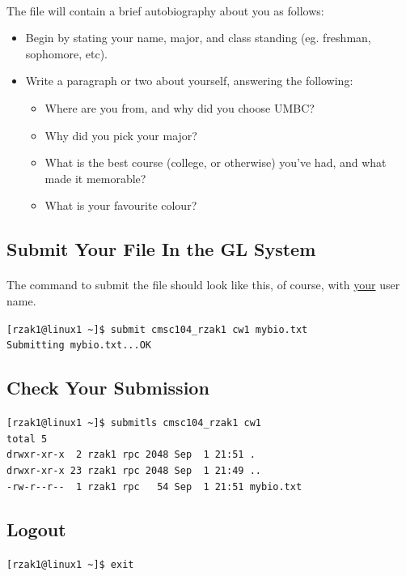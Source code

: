 \documentclass[letter,11pt]{article}
\begin{document}
\paragraph{}The file will contain a brief autobiography about you as follows:
\begin{itemize}
    \item Begin by stating your name, major, and class standing (eg. freshman, sophomore, etc).
    \item Write a paragraph or two about yourself, answering the following:
    \begin{itemize}
        \item Where are you from, and why did you choose UMBC?
        \item Why did you pick your major?
        \item What is the best course (college, or otherwise) you've had, and what made it memorable?
        \item What is your favourite colour?
    \end{itemize}
\end{itemize}

\subsection{Submit Your File In the GL System}
\paragraph{}The command to submit the file should look like this, of course, with \underline{your} user name.

\verb|[rzak1@linux1 ~]$ submit cmsc104_rzak1 cw1 mybio.txt| \\
\verb|Submitting mybio.txt...OK|

\subsection{Check Your Submission}
\verb|[rzak1@linux1 ~]$ submitls cmsc104_rzak1 cw1| \\
\verb|total 5| \\
\verb|drwxr-xr-x  2 rzak1 rpc 2048 Sep  1 21:51 .| \\
\verb|drwxr-xr-x 23 rzak1 rpc 2048 Sep  1 21:49 ..| \\
\verb|-rw-r--r--  1 rzak1 rpc   54 Sep  1 21:51 mybio.txt|

\subsection{Logout}
\verb|[rzak1@linux1 ~]$ exit| 
\end{document}
